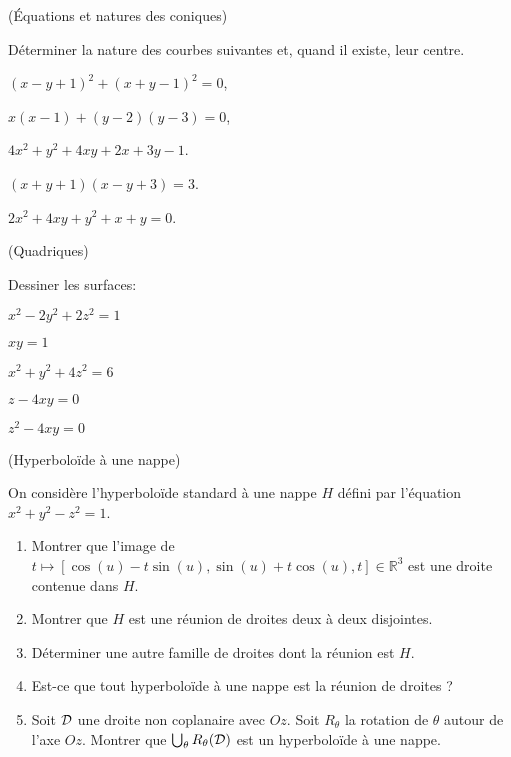 \documentclass[a4paper,12pt,reqno]{amsart}
\begin{document}
\begin{exo} (Équations et natures des coniques)

  Déterminer la nature des courbes suivantes et, quand il existe, leur centre.
  \begin{examplescol}{2}
    \item $(x-y+1)^2+(x+y-1)^2=0$,
    \item $x(x-1)+(y-2)(y-3)=0$,
    \item $4x^{2}+y^{2}+4xy+2x+3y-1$.
    \item $(x+y+1)(x-y+3)=3$.
    \item $2x^{2}+4xy+y^{2}+x+y=0$.
  \end{examplescol}

\end{exo}


\begin{exo} (Quadriques)

  Dessiner les surfaces:
  \begin{examplescol}{2}
    \item $x^2-2y^2+2z^2=1$
    \item $xy=1$
    \item $x^2+y^2+4z^2=6$
    \item $z-4xy=0$
    \item $z^2-4xy=0$
  \end{examplescol}

\end{exo}


\begin{exo} (Hyperboloïde à une nappe)

  On considère l'hyperboloïde standard à une nappe $H$ défini par l'équation $x^{2}+y^{2}-z^{2}=1$.
  \begin{enumerate}
    \item Montrer que l'image de $t\mapsto[\cos(u)-t\sin(u),\sin(u)+t\cos(u),t]\in \mathbb{R}^{3}$ est une droite contenue dans $H$.
    \item Montrer que $H$ est une réunion de droites deux à deux disjointes.
    \item Déterminer une autre famille de droites dont la réunion est $H$.
    \item Est-ce que tout hyperboloïde à une nappe est la réunion de droites ?
    \item Soit $\mathcal{D}$ une droite non coplanaire avec $Oz$. Soit $R_{\theta}$ la rotation de $\theta$ autour de l'axe $Oz$. Montrer que $\bigcup_{\theta}R_{\theta}(\mathcal{D})$ est un hyperboloïde à une nappe.
  \end{enumerate}

\end{exo}
\end{document}
